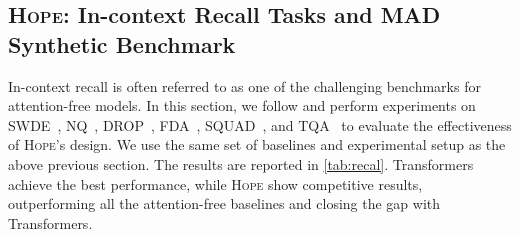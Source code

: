 \documentclass{article}
\newcommand{\citep}{\parencite}
\newcommand{\citet}{\textcite}
\newcommand{\model}[0]{\textsc{Hope}}
\begin{document}
{\subsection{\model: In-context Recall Tasks and MAD Synthetic Benchmark}\label{sec:retrieval-tasks}
In-context recall is often referred to as one of the challenging benchmarks for attention-free models. In this section, we follow \citet{arora2024simple} and perform experiments on SWDE~\citep{lockard2019openceres}, NQ~\citep{kwiatkowski2019natural}, DROP~\citep{dua2019drop}, FDA~\citep{arora2023language}, SQUAD~\citep{rajpurkar2016squad}, and TQA~\citep{kembhavi2017you} to evaluate the effectiveness of \model's design. We use the same set of baselines and experimental setup as the above previous section. The results are reported in \autoref{tab:recal}. Transformers achieve the best performance, while \model{} show competitive results, outperforming all the attention-free baselines and closing the gap with Transformers. 

}
\end{document}
